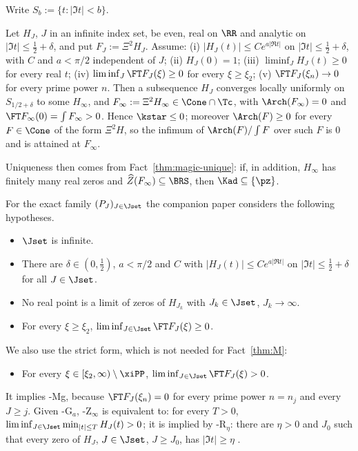 Write $S_b:=\{t:\lvert\Im t\rvert<b\}$.

\begin{fact}\label{lem:6prime}
Let $H_J$, $J$ in an infinite index set, be even, real on $\RR$ and analytic on $\lvert\Im t\rvert\le\frac12+\delta$, and put
$F_J:=\Xi^2H_J$. Assume: \textup{(i)} $\lvert H_J(t)\rvert\le Ce^{a\lvert\Re t\rvert}$ on $\lvert\Im t\rvert\le\frac12+\delta$, with $C$ and
$a<\pi/2$ independent of $J$; \textup{(ii)} $H_J(0)=1$; \textup{(iii)} $\liminf_JH_J(t)\ge0$ for every real $t$; \textup{(iv)}
$\liminf_J\FT F_J(\xi)\ge0$ for every $\xi\ge\xi_2$; \textup{(v)} $\FT F_J(\xi_n)\to0$ for every prime power $n$. Then a
subsequence $H_J$ converges locally uniformly on $S_{1/2+\delta}$ to some $H_\infty$, and $F_\infty:=\Xi^2H_\infty\in\Cone\cap\Tc$,
with $\Arch(F_\infty)=0$ and $\FT F_\infty(0)=\int F_\infty>0$. Hence $\kstar\le0$; moreover $\Arch(F)\ge0$ for every $F\in\Cone$ of the
form $\Xi^2H$, so the infimum of $\Arch(F)/\int F$ over such $F$ is $0$ and is attained at $F_\infty$.
\end{fact}

Uniqueness then comes from Fact~\ref{thm:magic-unique}: if, in addition, $H_\infty$ has finitely many real zeros and
$\widehat Z(F_\infty)\subseteq\BRS$, then $\Kad\subseteq\{\pz\}$.

For the exact family $(P_J)_{J\in\Jset}$ the companion paper considers the following hypotheses.
\begin{itemize}[leftmargin=3.2em]
\item[\hyp{N}] $\Jset$ is infinite.
\item[\hyp{G$_a$}] There are $\delta\in(0,\frac12)$, $a<\pi/2$ and $C$ with $\lvert H_J(t)\rvert\le Ce^{a\lvert\Re t\rvert}$ on
$\lvert\Im t\rvert\le\frac12+\delta$ for all $J\in\Jset$.
\item[\hyp{Z$_\infty$}] No real point is a limit of zeros of $H_{J_k}$ with $J_k\in\Jset$, $J_k\to\infty$.
\item[\hyp{Mg}] For every $\xi\ge\xi_2$, $\liminf_{J\in\Jset}\FT F_J(\xi)\ge0$.
\end{itemize}
We also use the strict form, which is not needed for Fact~\ref{thm:M}:
\begin{itemize}[leftmargin=3.2em]
\item[\hyp{Mg$_>$}] For every $\xi\in[\xi_2,\infty)\setminus\xiPP$, $\liminf_{J\in\Jset}\FT F_J(\xi)>0$.
\end{itemize}
It implies \hyp{Mg}, because $\FT F_J(\xi_n)=0$ for every prime power $n=n_j$ and every $J\ge j$.
Given \hyp{G$_a$}, \hyp{Z$_\infty$} is equivalent to: for every $T>0$, $\liminf_{J\in\Jset}\min_{\lvert t\rvert\le T}H_J(t)>0$; it is
implied by \hyp{R$_\eta$}: there are $\eta>0$ and $J_0$ such that every zero of $H_J$, $J\in\Jset$, $J\ge J_0$, has
$\lvert\Im t\rvert\ge\eta$ \cite{PaperI}.

